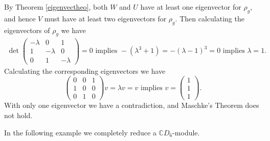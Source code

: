 \documentclass[../Project.tex]{subfiles}
\begin{document}
\begin{exam}
	By Theorem \ref{eigenvectheo}, both $W$ and $U$ have at least one eigenvector for $\rho_g$, and hence $V$ must have at least two eigenvectors for $\rho_g$. Then calculating the eigenvectors of $\rho_g$ we have
	\begin{align*}
		\det{\begin{pmatrix}-\lambda & 0 & 1\\1 & -\lambda & 0\\0 & 1 & -\lambda \end{pmatrix}} = 0 \text{ implies }
		-(\lambda^3 + 1) = -(\lambda - 1)^3 = 0 \text{ implies } \lambda = 1.
	\end{align*}
	Calculating the corresponding eigenvectors we have
	$$\begin{pmatrix}0 & 0 & 1\\1 & 0 & 0\\0 & 1 & 0 \end{pmatrix}v = \lambda v = v \text{ implies } v = \begin{pmatrix}1\\1\\1\end{pmatrix}.$$
	With only one eigenvector we have a contradiction, and Maschke's Theorem does not hold.\\
\end{exam}

In the following example we completely reduce a $\mathbb{C}D_6$-module.
\end{document}
